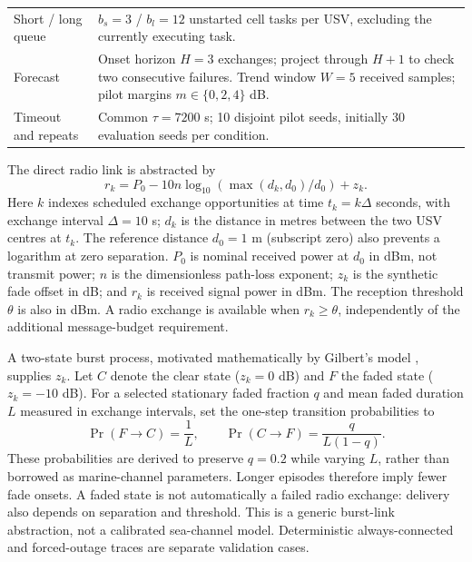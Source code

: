 \begin{table}[htbp]
{\begin{tabularx}{\linewidth}{@{}p{3.15cm}Y@{}}
Short / long queue & $b_s=3$ / $b_l=12$ unstarted cell tasks per USV, excluding the currently executing task.\\
Forecast & Onset horizon $H=3$ exchanges; project through $H+1$ to check two consecutive failures. Trend window $W=5$ received samples; pilot margins $m\in\{0,2,4\}$ dB.\\
Timeout and repeats & Common $\tau=7200$ s; 10 disjoint pilot seeds, initially 30 evaluation seeds per condition.\\
\bottomrule
\end{tabularx}\par}
\end{table}

The direct radio link is abstracted by
\begin{equation}
\label{eq:received-signal}
r_k=P_0-10n\log_{10}\!\left(\max(d_k,d_0)/d_0\right)+z_k.
\end{equation}
Here $k$ indexes scheduled exchange opportunities at time $t_k=k\Delta$ seconds, with exchange interval $\Delta=10$ s; $d_k$ is the distance in metres between the two USV centres at $t_k$. The reference distance $d_0=1$ m (subscript zero) also prevents a logarithm at zero separation. $P_0$ is nominal received power at $d_0$ in dBm, not transmit power; $n$ is the dimensionless path-loss exponent; $z_k$ is the synthetic fade offset in dB; and $r_k$ is received signal power in dBm. The reception threshold $\theta$ is also in dBm. A radio exchange is available when $r_k\geq\theta$, independently of the additional message-budget requirement.

A two-state burst process, motivated mathematically by Gilbert's model \cite{gilbert1960burst}, supplies $z_k$. Let $C$ denote the clear state ($z_k=0$ dB) and $F$ the faded state ($z_k=-10$ dB). For a selected stationary faded fraction $q$ and mean faded duration $L$ measured in exchange intervals, set the one-step transition probabilities to
\begin{equation}
\label{eq:fade-transitions}
\Pr(F\to C)=\frac{1}{L},\qquad
\Pr(C\to F)=\frac{q}{L(1-q)}.
\end{equation}
These probabilities are derived to preserve $q=0.2$ while varying $L$, rather than borrowed as marine-channel parameters. Longer episodes therefore imply fewer fade onsets. A faded state is not automatically a failed radio exchange: delivery also depends on separation and threshold. This is a generic burst-link abstraction, not a calibrated sea-channel model. Deterministic always-connected and forced-outage traces are separate validation cases.
